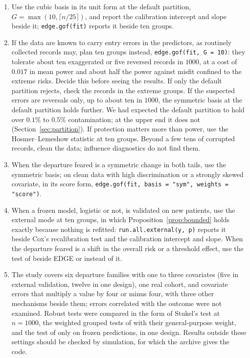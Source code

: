 \begin{enumerate}
\item Use the cubic basis in its unit form at the default partition, $G=\max(10,\lceil n/25\rceil)$, and
      report the calibration intercept and slope beside it; \texttt{edge.gof(fit)} reports it beside
      ten groups.
\item If the data are known to carry entry errors in the predictors, as routinely collected records
      may, plan ten groups instead, \texttt{edge.gof(fit, G = 10)}: they tolerate about ten exaggerated
      or five reversed records in $1000$, at a cost of $0.017$ in mean power and about half the power
      against misfit confined to the extreme risks. Decide this before seeing the results. If only the
      default partition rejects, check the records in the extreme groups. If the suspected errors are
      reversals only, up to about ten in $1000$, the symmetric basis at the default partition holds
      further. We had expected the default partition to hold over $0.1\%$ to $0.5\%$ contamination; at
      the upper end it does not (Section~\ref{sec:partition}). If protection
      matters more than power, use the Hosmer--Lemeshow statistic at ten groups. Beyond a few tens of
      corrupted records, clean the data; influence diagnostics do not find them.
\item When the departure feared is a symmetric change in both tails, use the symmetric basis; on clean
      data with high discrimination or a strongly skewed covariate, in its score form,
      \texttt{edge.gof(fit, basis = "sym", weights = "score")}.
\item When a frozen model, logistic or not, is validated on new patients, use the external mode at ten
      groups, in which Proposition~\ref{prop:bounded} holds exactly because nothing is refitted:
      \texttt{run.all.external(y, p)} reports it beside Cox's recalibration test and the calibration
      intercept and slope. When the departure feared is a shift in the overall risk or a threshold
      effect, use the test of \citet{sadatsafavi2024nonparametric} beside EDGE or instead of it.
\item The study covers six departure families with one to three covariates (five in external
      validation, twelve in one design), one real cohort, and covariate errors that multiply a value by
      four or minus four, with three other mechanisms beside them; errors correlated with the outcome
      were not examined. Robust tests were compared in the form of Stukel's test at $n=1000$, the
      weighted grouped tests of \citet{hosmer2002goodness} with their general-purpose weight, and the
      test of \citet{sadatsafavi2024nonparametric} only on frozen predictions, in one design. Results
      outside these settings should be checked by simulation, for which the archive gives the code.
\end{enumerate}

